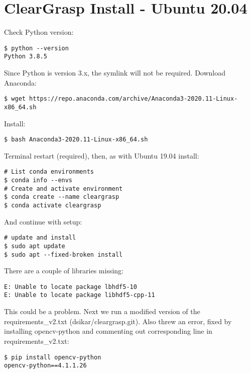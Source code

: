 \section{ClearGrasp Install - Ubuntu 20.04}

Check Python version:
\begin{verbatim}
$ python --version
Python 3.8.5    
\end{verbatim}
Since Python is version 3.x, the symlink will not be required. Download Anaconda:
\begin{verbatim}
$ wget https://repo.anaconda.com/archive/Anaconda3-2020.11-Linux-x86_64.sh    
\end{verbatim}
Install:
\begin{verbatim}
$ bash Anaconda3-2020.11-Linux-x86_64.sh    
\end{verbatim}
Terminal restart (required), then, as with Ubuntu 19.04 install:
\begin{verbatim}
# List conda environments
$ conda info --envs
# Create and activate environment
$ conda create --name cleargrasp
$ conda activate cleargrasp
\end{verbatim}
And continue with setup:
\begin{verbatim}
# update and install
$ sudo apt update
$ sudo apt --fixed-broken install
\end{verbatim}
There are a couple of libraries missing:
\begin{verbatim}
E: Unable to locate package lbhdf5-10
E: Unable to locate package libhdf5-cpp-11
\end{verbatim}
This could be a problem. Next we run a modified version of the requirements\_v2.txt (dsikar/cleargrasp.git). Also threw an error, fixed by installing opencv-python and commenting out corresponding line in requirements\_v2.txt:
\begin{verbatim}
$ pip install opencv-python
opencv-python==4.1.1.26

\end{verbatim}






